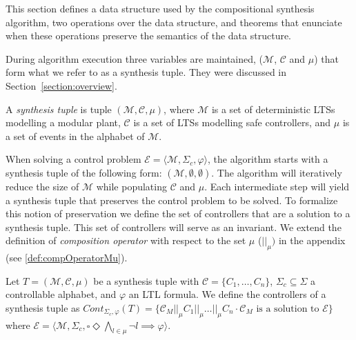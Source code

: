 This section defines a data structure used by the compositional synthesis algorithm, two operations over the data structure, and theorems that enunciate when these operations preserve the semantics of the data structure. 



\label{subsection:synthesis-tuple}

During algorithm execution three variables are maintained, ($\mathcal{M}$, $\mathcal{C}$ and $\mu$) that form what we refer to as a 
synthesis tuple. They were discussed in  Section~\ref{section:overview}.

\begin{definition} \label{def:synthesis-tuple}
    A \textit{synthesis tuple} is tuple  $(\mathcal{M}, \mathcal{C}, \mu)$, where 
    $\mathcal{M}$ is a set of deterministic LTSs modelling a modular plant,  $\mathcal{C}$ is a set of LTSs modelling safe controllers, 
    and $\mu$ is a set of events in the alphabet of $\mathcal{M}$.
\end{definition}

When solving a control problem $\mathcal{E} = \langle \mathcal{M}, \Sigma_c, \varphi 
\rangle$, the algorithm starts with a synthesis tuple of the following form: 
$(\mathcal{M}, \emptyset, \emptyset)$.  The algorithm will iteratively reduce the size of $\mathcal{M}$  while populating 
$\mathcal{C}$ and $\mu$. 
Each intermediate step will yield a synthesis tuple that preserves the control problem to be solved. 
To formalize this notion of preservation we define the set of controllers that are a solution 
to a synthesis tuple. This set of controllers will serve as an invariant. We extend the definition of \textit{composition operator} with respect to the set $\mu$ ($||_{\mu})$ in the appendix (see \ref{def:compOperatorMu}).

\begin{definition}
    \label{def:tuple-controller}
    Let $T = (\mathcal{M}, \mathcal{C}, \mu)$ be a synthesis tuple with 
    $\mathcal{C} = \{C_1, \ldots, C_n\}$, 
   $\Sigma_c \subseteq \Sigma$ a controllable alphabet, and $\varphi$ an LTL formula. We define the controllers of a synthesis tuple as
            $Cont_{\Sigma_c, \varphi}(T) = \{ \mathcal{C}_{M} ||_{\mu} C_1 ||_{\mu} \ldots 
            ||_{\mu} C_n \cdot \mathcal{C}_M  \mbox{ is a solution to } \mathcal{E}   \}        $  where $\mathcal{E} = \langle \mathcal{M}, \Sigma_c, 
     \square \Diamond \bigwedge_{l \in 
        \mu} \neg l \!\!\! \implies \!\!\! \varphi 
        \rangle$.

\end{definition}

